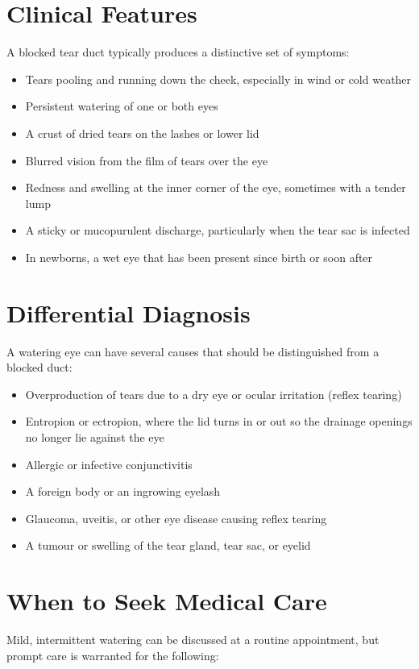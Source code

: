 \section*{Clinical Features}
A blocked tear duct typically produces a distinctive set of symptoms:

\begin{itemize}
    \item Tears pooling and running down the cheek, especially in wind or cold weather
    \item Persistent watering of one or both eyes
    \item A crust of dried tears on the lashes or lower lid
    \item Blurred vision from the film of tears over the eye
    \item Redness and swelling at the inner corner of the eye, sometimes with a tender lump
    \item A sticky or mucopurulent discharge, particularly when the tear sac is infected
    \item In newborns, a wet eye that has been present since birth or soon after
\end{itemize}

\section*{Differential Diagnosis}
A watering eye can have several causes that should be distinguished from a blocked duct:

\begin{itemize}
    \item Overproduction of tears due to a dry eye or ocular irritation (reflex tearing)
    \item Entropion or ectropion, where the lid turns in or out so the drainage openings no longer lie against the eye
    \item Allergic or infective conjunctivitis
    \item A foreign body or an ingrowing eyelash
    \item Glaucoma, uveitis, or other eye disease causing reflex tearing
    \item A tumour or swelling of the tear gland, tear sac, or eyelid
\end{itemize}

\section*{When to Seek Medical Care}
Mild, intermittent watering can be discussed at a routine appointment, but prompt care is warranted for the following:


